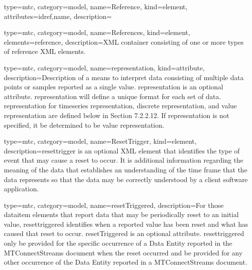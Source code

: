 {
  type=mtc,
  category=model,
  name={Reference},
  kind={element},
  attributes={\gls{idref},\gls{name}},
  description={}
}


{
  type=mtc,
  category=model,
  name={References},
  kind={element},
  elements={\gls{reference}},
  description={XML container consisting of one or more types of \gls{reference} XML elements.}
}


{
  type=mtc,
  category=model,
  name={representation},
  kind={attribute},
  description={Description of a means to interpret data consisting of multiple data points or samples reported as a single value.  \newline \gls{representation} is an optional attribute.  \newline \gls{representation} will define a unique format for each set of data.  \newline \gls{representation} for \gls{timeseries representation}, \gls{discrete representation}, and \gls{value representation} are defined below in Section {\color{red} 7.2.2.12}.  \newline If \gls{representation} is not specified, it \MUST be determined to be \gls{value representation}.}
}


{
  type=mtc,
  category=model,
  name={ResetTrigger},
  kind={element},
  description={\gls{resettrigger} is an optional XML element that identifies the type of event that may cause a reset to occur. It is additional information regarding the meaning of the data that establishes an understanding of the time frame that the data represents so that the data may be correctly understood by a client software application.}
}


{
  type=mtc,
  category=model,
  name={resetTriggered},
  description={For those \gls{dataitem} elements that report data that may be periodically reset to an initial value, \gls{resettriggered} identifies when a reported value has been reset and what has caused that reset to occur.  \newline resetTriggered is an optional attribute.  \newline \gls{resettriggered} \MUST only be provided for the specific occurrence of a Data Entity reported in the MTConnectStreams document when the reset occurred and \MUSTNOT be provided for any other occurrence of the Data Entity reported in a MTConnectStreams document.}
}


